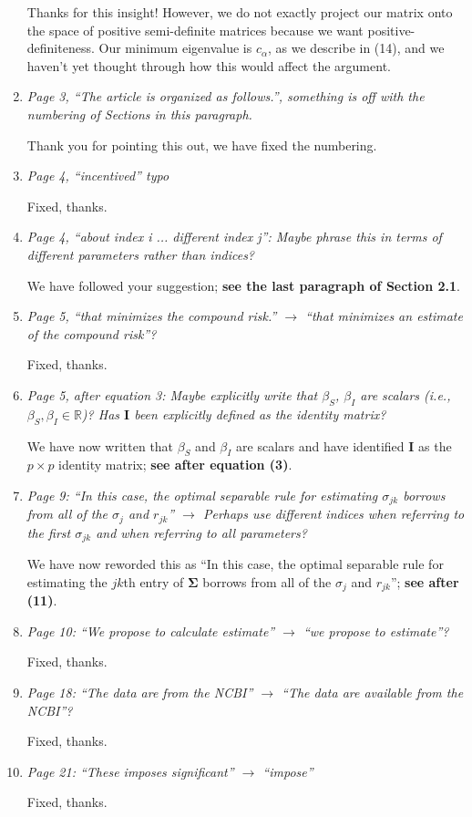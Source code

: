 \documentclass[12pt]{article}
\def\bs{\boldsymbol}
\begin{document}
\begin{enumerate}
  Thanks for this insight! However, we do not exactly project our matrix onto the space of positive semi-definite matrices because we want positive-definiteness. Our minimum eigenvalue is $c_\alpha$, as we describe in (14), and we haven't yet thought through how this would affect the argument.

\item \emph{Page 3, ``The article is organized as follows.'', something is off with the numbering of Sections in this paragraph. }

  Thank you for pointing this out, we have fixed the numbering.

\item \emph{Page 4, ``incentived'' typo }

  Fixed, thanks.

\item \emph{Page 4, ``about index i ... different index j'': Maybe phrase this in terms of different parameters rather than indices?}

  We have followed your suggestion; \textbf{see the last paragraph of Section 2.1}.

\item \emph{Page 5, ``that minimizes the compound risk.” $\rightarrow$ “that minimizes an estimate of the compound risk''?}

  Fixed, thanks.

\item \emph{Page 5, after equation 3: Maybe explicitly write that $\beta_S$, $\beta_I$ are scalars (i.e., $\beta_S, \beta_I \in \mathbb{R}$)? Has $\bs{I}$ been explicitly defined as the identity matrix? }

  We have now written that $\beta_S$ and $\beta_I$ are scalars and have identified $\bs{I}$ as the $p \times p$ identity matrix; \textbf{see after equation (3)}.

\item \emph{Page 9: ``In this case, the optimal separable rule for estimating $\sigma_{jk}$ borrows from all of the $\sigma_j$ and $r_{jk}$'' $\rightarrow$ Perhaps use different indices when referring to the first $\sigma_{jk}$ and when referring to all parameters? }

  We have now reworded this as ``In this case, the optimal separable rule for estimating the $jk$th entry of $\bs{\Sigma}$ borrows from all of the $\sigma_j$ and $r_{jk}$''; \textbf{see after (11)}.

\item \emph{Page 10: ``We propose to calculate estimate'' $\rightarrow$ ``we propose to estimate''?}

  Fixed, thanks.

\item \emph{Page 18: ``The data are from the NCBI'' $\rightarrow$ ``The data are available from the NCBI''?}

  Fixed, thanks.

\item \emph{Page 21: ``These imposes significant'' $\rightarrow$ ``impose'' }

  Fixed, thanks.
  
\end{enumerate}



\end{document}
